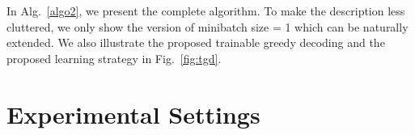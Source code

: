 





 
In Alg.~\ref{algo2}, we present the complete algorithm. To make the description less cluttered, we only show the version of minibatch size = 1 which can be naturally extended. We also illustrate the proposed trainable greedy decoding and the proposed learning strategy in Fig.~\ref{fig:tgd}.


\section{Experimental Settings}

